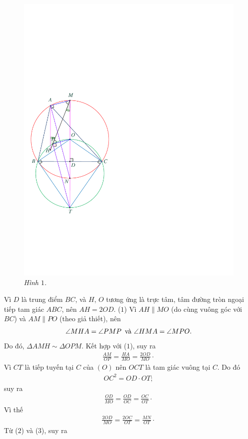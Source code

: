 \begin{multicols}{2}
\begin{figure}[H]
		\includegraphics[width=0.68\linewidth]{P619H1}
		\caption{\small\textit{\color{thachthuctoanhoc}Hình $1$.}}
		\vspace*{-10pt}
	\end{figure}
	Vì $D$ là trung điểm $BC$, và $H$, $O$ tương ứng là trực tâm, tâm đường tròn ngoại tiếp tam giác $ABC$, nên $AH = 2OD$. \hfill ($1$)
	\vskip 0.05cm
	Vì $AH \parallel MO$ (do cùng vuông góc với $BC$) và $AM \parallel PO$ (theo giả thiết), nên
	\begin{align*}
		\angle MHA = \angle PMP \text{\color{black}\, và } \angle HMA = \angle MPO.
	\end{align*}
	Do đó, $\Delta AMH \sim \Delta OPM$. Kết hợp với ($1$), suy ra
	\begin{align*}
		\frac{{AM}}{{OP}} = \frac{{HA}}{{MO}} = \frac{{2OD}}{{MO}} \cdot \tag{$2$}
	\end{align*}
	Vì $CT$ là tiếp tuyến tại $C$ của $(O)$ nên $OCT$ là tam giác vuông tại $C$. Do đó
	\begin{align*}
		O{C^2} = OD \cdot OT;
	\end{align*}
	suy ra
	\begin{align*}
		\frac{{OD}}{{MO}} = \frac{{OD}}{{OC}} = \frac{{OC}}{{OT}} \cdot
	\end{align*}
	Vì thế
	\begin{align*}
		\frac{{2OD}}{{MO}} = \frac{{2OC}}{{OT}} = \frac{{MN}}{{OT}} \cdot \tag{$3$}
	\end{align*}
	Từ ($2$) và ($3$), suy ra

\end{multicols}
